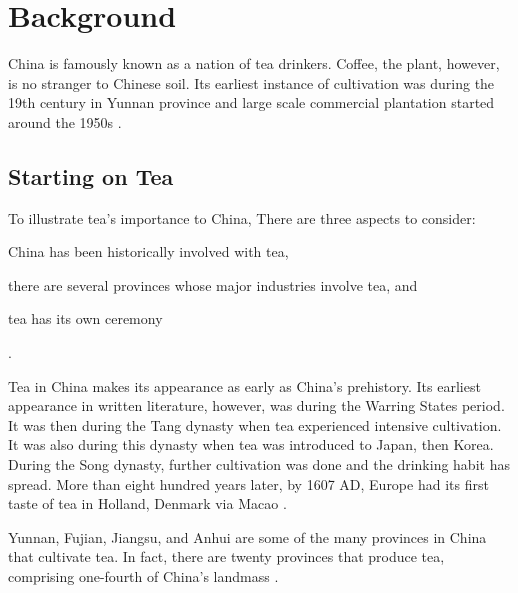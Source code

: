 \chapter{Background}\label{chap:background}

China is famously known as a nation of tea drinkers. Coffee, the plant, however,
is no stranger to Chinese soil. Its earliest instance of cultivation was during
the 19th century in Yunnan province and large scale commercial plantation started
around the 1950s \autocite{zhang_coffee_2014}.

\section{Starting on Tea}


To illustrate tea's importance to China, There are three aspects to consider:
\begin{enumerate*}
	\item China has been historically involved with tea,
	\item there are several provinces whose major industries involve tea, and
	\item tea has its own ceremony
\end{enumerate*}.

Tea in China makes its appearance as early as China's prehistory. Its earliest
appearance in written literature, however, was during the Warring States period.
It was then during the Tang dynasty when tea experienced intensive cultivation.
It was also during this dynasty when tea was introduced to Japan, then Korea.
During the Song dynasty, further cultivation was done and the drinking habit has
spread. More than eight hundred years later, by 1607 AD, Europe had its first
taste of tea in Holland, Denmark via Macao \autocite{chen_tea_2012}.

Yunnan, Fujian, Jiangsu, and Anhui are some of the many provinces in China that
cultivate tea. In fact, there are twenty provinces that produce tea, comprising
one-fourth of China's landmass \autocite{chen_tea_2012}. %


